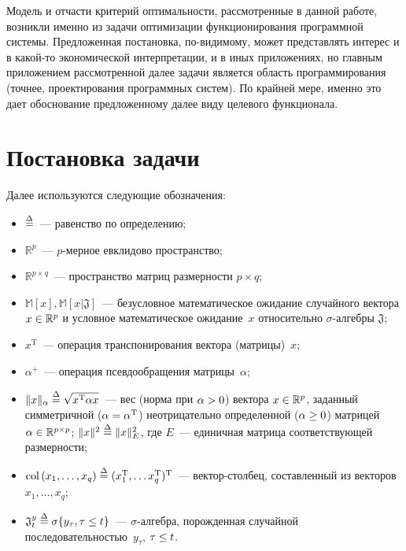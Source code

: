 \begin{multicols}{2}
 Модель и отчасти критерий оптимальности, рассмотренные в данной
работе, возникли именно из задачи оптимизации функционирования
программной системы. Предложенная постановка, по-ви\-ди\-мо\-му, может
представлять интерес и в ка\-кой-то экономической интерпретации, и в иных
приложениях, но главным приложением рассмотренной далее задачи является
область программирования (точнее, проектирования программных систем). По
крайней мере, именно это дает обоснование предложенному далее виду
целевого функционала.

\section{Постановка задачи}

 Далее используются следующие обозначения:
 \begin{itemize}
 \item $\stackrel{\Delta}{=}$~--- равенство по определению;
\item $\mathbb{R}^p$~--- $p$-мерное евклидово пространство;
\item $\mathbb{R}^{p\times q}$~--- пространство матриц размерности
$p\times q$;
\item $\mathbb{M}[x], \mathbb{M}[x\vert \mathfrak{J}]$~--- безусловное
математическое ожидание случайного вектора $x\hm\in\mathbb{R}^p$ и
условное математическое ожидание~$x$ относительно
$\sigma$-ал\-геб\-ры $\mathfrak{J}$;
\item $x^{\mathrm{T}}$~--- операция транспонирования вектора (мат\-ри\-цы)~$x$;
\item $\alpha^+$~--- операция псевдообращения матрицы~$\alpha$;
\item $\| x\|_\alpha \stackrel{\Delta}{=} \sqrt{x^{\mathrm{T}} \alpha x}$~--- вес (норма при $\alpha\hm>0$)
вектора $x\hm\in \mathbb{R}^p$, заданный симметричной
($\alpha\hm=\alpha^{\mathrm{T}}$) неотрицательно определенной ($\alpha\hm\geq0$)
матрицей $\alpha\hm\in \mathbb{R}^{p\times p}$; $\| x\|^2\stackrel{\Delta}{=} \|x\|^2_E$,
где $E$~--- единичная матрица соответствующей размерности;
\item $\mathrm{col}\left(x_1,\ldots , x_q\right)\stackrel{\Delta}{=} (x_1^{\mathrm{T}},
\ldots x_q^{\mathrm{T}})^{\mathrm{T}}$~---
век\-тор-стол\-бец, составленный из векторов $x_1, \ldots , x_q$;
\item $\mathfrak{J}_t^y\stackrel{\Delta}{=} \sigma\{y_\tau, \tau\leq t\}$~---
$\sigma$-ал\-геб\-ра, порожденная случайной
последовательностью~$y_\tau$, $\tau\hm\leq t$.
\end{itemize}


\end{multicols}
